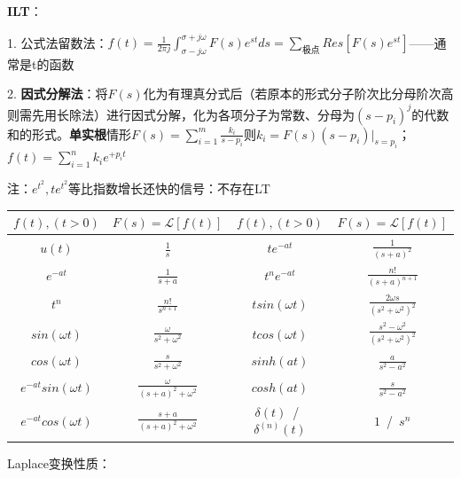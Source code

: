\textbf{ILT}：

1. 公式法留数法：$f(t)=\frac{1}{2\pi j}\int_{\sigma -j\omega}^{\sigma +j\omega}F(s)e^{st}ds=\sum_{\text{极点}}Res[F(s)e^{st}]$——通常是t的函数

2. \textbf{因式分解法}：将$F(s)$化为有理真分式后（若原本的形式分子阶次比分母阶次高则需先用长除法）进行因式分解，化为各项分子为常数、分母为$(s-p_i)^j$的代数和的形式。\textbf{单实根}情形$F(s)=\sum_{i=1}^{m}\frac{k_i}{s-p_i}$则$k_i=F(s)(s-p_i)|_{s=p_{i}}$；$f(t)=\sum_{i=1}^{n}k_{i}e^{+p_{i}t}$

注：$e^{t^2},te^{t^2}$等比指数增长还快的信号：不存在LT

\begin{center}
\begin{tabular}{|c|c|c|c|}
\hline
$f(t),(t>0)$ & $F(s)=\mathcal{L}[f(t)]$ & $f(t),(t>0)$ & $F(s)=\mathcal{L}[f(t)]$ \\
\hline
$u(t)$ & $\frac{1}{s}$ & $te^{-at}$ & $\frac{1}{(s+a)^2}$ \\
\hline
$e^{-at}$ & $\frac{1}{s+a}$ & $t^ne^{-at}$ & $\frac{n!}{(s+a)^{n+1}}$ \\
\hline
$t^{n}$ & $\frac{n!}{s^{n+1}}$ & $tsin(\omega t)$ & $\frac{2\omega s}{(s^2+\omega^2)^2}$ \\
\hline
$sin(\omega t)$ & $\frac{\omega}{s^2+\omega^2}$ & $tcos(\omega t)$ & $\frac{s^2-\omega^2}{(s^2+\omega^2)^2}$ \\
\hline
$cos(\omega t)$ & $\frac{s}{s^2+\omega^2}$ & $sinh(at)$ & $\frac{a}{s^2-a^2}$ \\
\hline
$e^{-at}sin(\omega t)$ & $\frac{\omega}{(s+a)^2+\omega^2}$ & $cosh(at)$ & $\frac{s}{s^2-a^2}$ \\
\hline
$e^{-at}cos(\omega t)$ & $\frac{s+a}{(s+a)^2+\omega^2}$ & $\delta(t)$~/~$\delta^{(n)}(t)$ & $1$~/~$s^n$ \\
\hline
\end{tabular}
\end{center}

Laplace变换性质：

